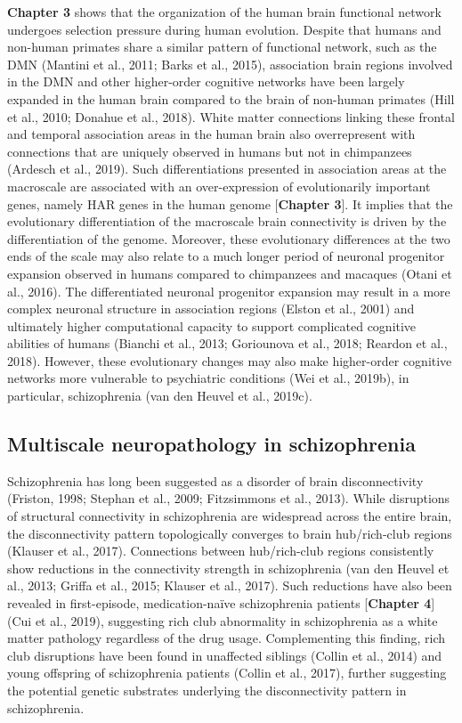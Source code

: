 \begin{refsection}
\textbf{Chapter 3} shows that the organization of the human brain functional network undergoes selection pressure during human evolution. Despite that humans and non-human primates share a similar pattern of functional network, such as the DMN (Mantini et al., 2011; Barks et al., 2015), association brain regions involved in the DMN and other higher-order cognitive networks have been largely expanded in the human brain compared to the brain of non-human primates (Hill et al., 2010; Donahue et al., 2018). White matter connections linking these frontal and temporal association areas in the human brain also overrepresent with connections that are uniquely observed in humans but not in chimpanzees (Ardesch et al., 2019). Such differentiations presented in association areas at the macroscale are associated with an over-expression of evolutionarily important genes, namely HAR genes in the human genome [\textbf{Chapter 3}]. It implies that the evolutionary differentiation of the macroscale brain connectivity is driven by the differentiation of the genome. Moreover, these evolutionary differences at the two ends of the scale may also relate to a much longer period of neuronal progenitor expansion observed in humans compared to chimpanzees and macaques (Otani et al., 2016). The differentiated neuronal progenitor expansion may result in a more complex neuronal structure in association regions (Elston et al., 2001) and ultimately higher computational capacity to support complicated cognitive abilities of humans (Bianchi et al., 2013; Goriounova et al., 2018; Reardon et al., 2018). However, these evolutionary changes may also make higher-order cognitive networks more vulnerable to psychiatric conditions (Wei et al., 2019b), in particular, schizophrenia (van den Heuvel et al., 2019c).

\subsection*{Multiscale neuropathology in schizophrenia}
Schizophrenia has long been suggested as a disorder of brain disconnectivity (Friston, 1998; Stephan et al., 2009; Fitzsimmons et al., 2013). While disruptions of structural connectivity in schizophrenia are widespread across the entire brain, the disconnectivity pattern topologically converges to brain hub/rich-club regions (Klauser et al., 2017). Connections between hub/rich-club regions consistently show reductions in the connectivity strength in schizophrenia (van den Heuvel et al., 2013; Griffa et al., 2015; Klauser et al., 2017). Such reductions have also been revealed in first-episode, medication-naïve schizophrenia patients [\textbf{Chapter 4}] (Cui et al., 2019), suggesting rich club abnormality in schizophrenia as a white matter pathology regardless of the drug usage. Complementing this finding, rich club disruptions have been found in unaffected siblings (Collin et al., 2014) and young offspring of schizophrenia patients (Collin et al., 2017), further suggesting the potential genetic substrates underlying the disconnectivity pattern in schizophrenia.


\end{refsection}

